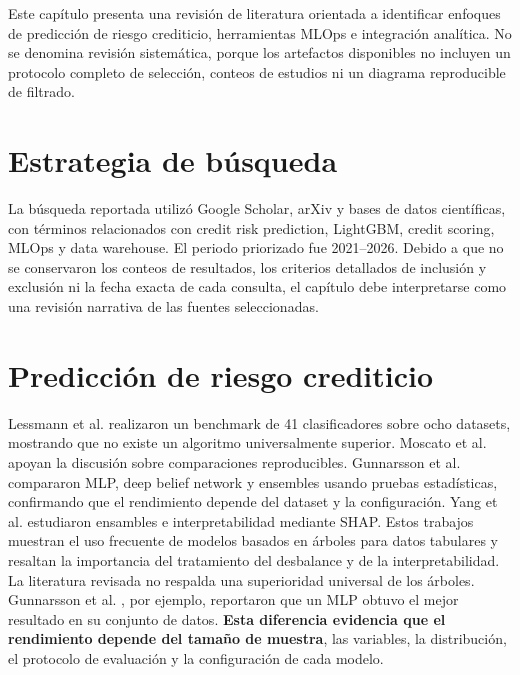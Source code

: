 Este capítulo presenta una revisión de literatura orientada a identificar enfoques de predicción de riesgo crediticio, herramientas MLOps e integración analítica. No se denomina revisión sistemática, porque los artefactos disponibles no incluyen un protocolo completo de selección, conteos de estudios ni un diagrama reproducible de filtrado.

\section{Estrategia de búsqueda}

La búsqueda reportada utilizó Google Scholar, arXiv y bases de datos científicas, con términos relacionados con credit risk prediction, LightGBM, credit scoring, MLOps y data warehouse. El periodo priorizado fue 2021--2026. Debido a que no se conservaron los conteos de resultados, los criterios detallados de inclusión y exclusión ni la fecha exacta de cada consulta, el capítulo debe interpretarse como una revisión narrativa de las fuentes seleccionadas.

\section{Predicción de riesgo crediticio}

Lessmann et al. \cite{lessmann2015benchmarking} realizaron un benchmark de 41 clasificadores sobre ocho datasets, mostrando que no existe un algoritmo universalmente superior. Moscato et al. \cite{moscato2021benchmark} apoyan la discusión sobre comparaciones reproducibles. Gunnarsson et al. \cite{gunnarsson2021deep} compararon MLP, deep belief network y ensembles usando pruebas estadísticas, confirmando que el rendimiento depende del dataset y la configuración. Yang et al. \cite{yang2025interpretable} estudiaron ensambles e interpretabilidad mediante SHAP. Estos trabajos muestran el uso frecuente de modelos basados en árboles para datos tabulares y resaltan la importancia del tratamiento del desbalance y de la interpretabilidad.\\

La literatura revisada no respalda una superioridad universal de los árboles. Gunnarsson et al. \cite{gunnarsson2021deep}, por ejemplo, reportaron que un MLP obtuvo el mejor resultado en su conjunto de datos. \textbf{Esta diferencia evidencia que el rendimiento depende del tamaño de muestra}, las variables, la distribución, el protocolo de evaluación y la configuración de cada modelo.\\

